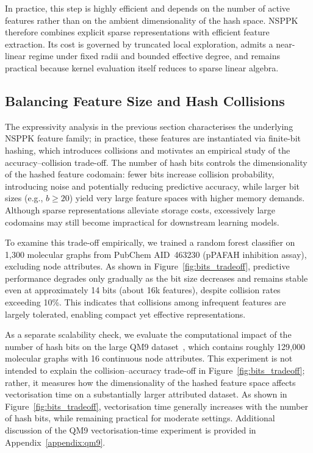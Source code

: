 In practice, this step is highly efficient and depends on the number of active
features rather than on the ambient dimensionality of the hash space. NSPPK
therefore combines explicit sparse representations with efficient feature
extraction. Its cost is governed by truncated local exploration, admits a
near-linear regime under fixed radii and bounded effective degree, and remains
practical because kernel evaluation itself reduces to sparse linear algebra.

\subsection{Balancing Feature Size and Hash Collisions}

The expressivity analysis in the previous section characterises the underlying
NSPPK feature family; in practice, these features are instantiated via finite-bit
hashing, which introduces collisions and motivates an empirical study of the
accuracy--collision trade-off. The number of hash bits controls the dimensionality
of the hashed feature codomain: fewer bits increase collision probability,
introducing noise and potentially reducing predictive accuracy, while larger bit
sizes (e.g., $b \ge 20$) yield very large feature spaces with higher memory
demands. Although sparse representations alleviate storage costs, excessively
large codomains may still become impractical for downstream learning models.

To examine this trade-off empirically, we trained a random forest classifier on
1{,}300 molecular graphs from PubChem AID~463230 (pPAFAH inhibition assay),
excluding node attributes. As shown in
Figure~\ref{fig:bits_tradeoff}, predictive performance
degrades only gradually as the bit size decreases and remains stable even at
approximately 14 bits (about 16k features), despite collision rates exceeding
10\%. This indicates that collisions among infrequent features are largely
tolerated, enabling compact yet effective representations.

As a separate scalability check, we evaluate the computational impact of the
number of hash bits on the large QM9 dataset~\citep{ramakrishnan2014quantum},
which contains roughly 129{,}000 molecular graphs with 16 continuous node
attributes. This experiment is not intended to explain the collision--accuracy
trade-off in Figure~\ref{fig:bits_tradeoff}; rather, it
measures how the dimensionality of the hashed feature space affects
vectorisation time on a substantially larger attributed dataset. As shown in
Figure~\ref{fig:bits_tradeoff}, vectorisation time
generally increases with the number of hash bits, while remaining practical for
moderate settings. Additional discussion of the QM9 vectorisation-time
experiment is provided in Appendix~\ref{appendix:qm9}.

